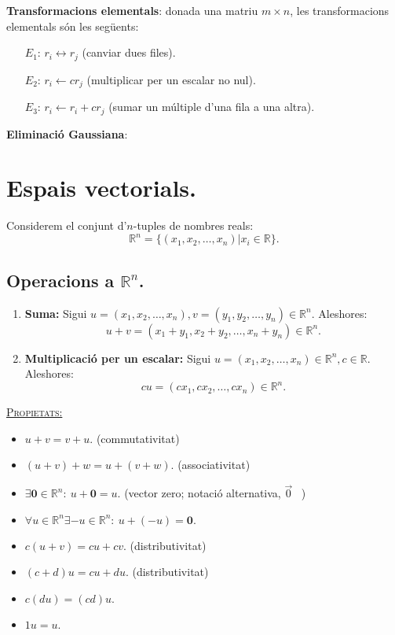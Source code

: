\documentclass[11pt]{article}
\begin{document}
\textbf{Transformacions elementals}: donada una matriu $m\times n$, les transformacions elementals són les següents:
\begin{itemize}
	\item[$E_1$: ]$r_i\leftrightarrow r_j$ (canviar dues files).
	\item[$E_2$: ]$r_i\leftarrow cr_j$ (multiplicar per un escalar no nul).
	\item[$E_3$: ]$r_i\leftarrow r_i+cr_j$ (sumar un múltiple d'una fila a una altra).
\end{itemize}
\textbf{Eliminació Gaussiana}: 
















\newpage
\section{Espais vectorials.}
Considerem el conjunt d'$n$-tuples de nombres reals:
$$\mathbb{R}^n=\{(x_1,x_2,\ldots,x_n)|x_i\in\mathbb{R}\}.$$
\subsection{Operacions a $\mathbb{R}^n$.}
\begin{enumerate}
	\item \textbf{Suma:} Sigui $u=(x_1,x_2,\ldots,x_n),v=(y_1,y_2,\ldots,y_n)\in\mathbb{R}^n$. Aleshores:
	$$u+v=(x_1+y_1,x_2+y_2,\ldots,x_n+y_n)\in\mathbb{R}^n.$$
	\item \textbf{Multiplicació per un escalar:} Sigui $u=(x_1,x_2,\ldots,x_n)\in\mathbb{R}^n,c\in\mathbb{R}$. Aleshores:
	$$cu=(cx_1,cx_2,\ldots,cx_n)\in\mathbb{R}^n.$$
\end{enumerate}
\underline{{\scshape Propietats:}}
\begin{itemize}
	\item $u+v=v+u.$ (commutativitat)
	\item $(u+v)+w=u+(v+w).$ (associativitat)
	\item $\exists\textbf{0}\in\mathbb{R}^n: \ u+\textbf{0}=u.$ (vector zero; notació alternativa, $\vec{0}$ \ )
	\item $\forall u\in\mathbb{R}^n\exists -u\in\mathbb{R}^n: \ u + (-u) = \textbf{0}.$
	\item $c(u+v)=cu+cv.$ (distributivitat)
	\item $(c+d)u=cu+du.$ (distributivitat)
	\item $c(du)=(cd)u.$
	\item $1u=u.$
\end{itemize}
\end{document}
